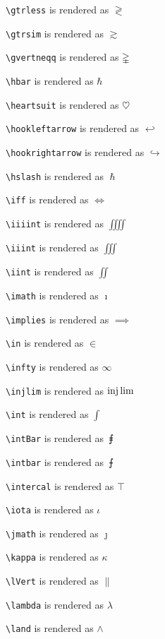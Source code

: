 \texttt{\textbackslash gtrless} is rendered as $\gtrless$

\texttt{\textbackslash gtrsim} is rendered as $\gtrsim$

\texttt{\textbackslash gvertneqq} is rendered as $\gvertneqq$

\texttt{\textbackslash hbar} is rendered as $\hbar$

\texttt{\textbackslash heartsuit} is rendered as $\heartsuit$

\texttt{\textbackslash hookleftarrow} is rendered as $\hookleftarrow$

\texttt{\textbackslash hookrightarrow} is rendered as $\hookrightarrow$

\texttt{\textbackslash hslash} is rendered as $\hslash$

\texttt{\textbackslash iff} is rendered as $\iff$

\texttt{\textbackslash iiiint} is rendered as $\iiiint$

\texttt{\textbackslash iiint} is rendered as $\iiint$

\texttt{\textbackslash iint} is rendered as $\iint$

\texttt{\textbackslash imath} is rendered as $\imath$

\texttt{\textbackslash implies} is rendered as $\implies$

\texttt{\textbackslash in} is rendered as $\in$

\texttt{\textbackslash infty} is rendered as $\infty$

\texttt{\textbackslash injlim} is rendered as $\injlim$

\texttt{\textbackslash int} is rendered as $\int$

\texttt{\textbackslash intBar} is rendered as $\intBar$

\texttt{\textbackslash intbar} is rendered as $\intbar$

\texttt{\textbackslash intercal} is rendered as $\intercal$

\texttt{\textbackslash iota} is rendered as $\iota$

\texttt{\textbackslash jmath} is rendered as $\jmath$

\texttt{\textbackslash kappa} is rendered as $\kappa$

\texttt{\textbackslash lVert} is rendered as $\lVert$

\texttt{\textbackslash lambda} is rendered as $\lambda$

\texttt{\textbackslash land} is rendered as $\land$

